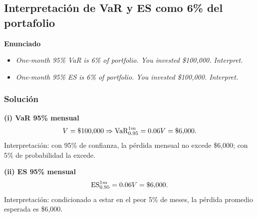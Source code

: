﻿\subsection{Interpretación de VaR y ES como 6\% del portafolio}

\textbf{Enunciado}
\begin{itemize}
\item \emph{One-month 95\% VaR is 6\% of portfolio. You invested \$100,000. Interpret.}
\item \emph{One-month 95\% ES is 6\% of portfolio. You invested \$100,000. Interpret.}
\end{itemize}


\subsubsection*{Solución}

\textbf{(i) VaR 95\% mensual}\\
\[
V=\$100{,}000\Rightarrow \mathrm{VaR}_{0.95}^{1m}=0.06V=\$6{,}000.
\]
Interpretación: con 95\% de confianza, la pérdida mensual no excede \$6,000; con 5\% de probabilidad la excede.

\textbf{(ii) ES 95\% mensual}\\
\[
\mathrm{ES}_{0.95}^{1m}=0.06V=\$6{,}000.
\]
Interpretación: condicionado a estar en el peor 5\% de meses, la pérdida promedio esperada es \$6,000.









